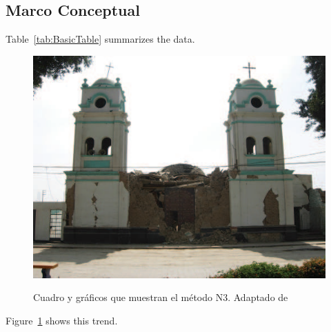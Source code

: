 \subsection{Marco Conceptual}

Table~\ref{tab:BasicTable} summarizes the data. \lipsum[15]



\begin{figure}[ht]
  \caption[Cuadro y gráficos que muestran el método N3]{Cuadro y gráficos que muestran el método N3. Adaptado de \cite{deWaal2009}}
  \includegraphics[scale=0.50]{F_Figures/11_Chapter II/Cap2_Imagen3c.png}
	\label{fig:Figure12}
\end{figure}

Figure~\ref{fig:Figure12} shows this trend. \lipsum[16]